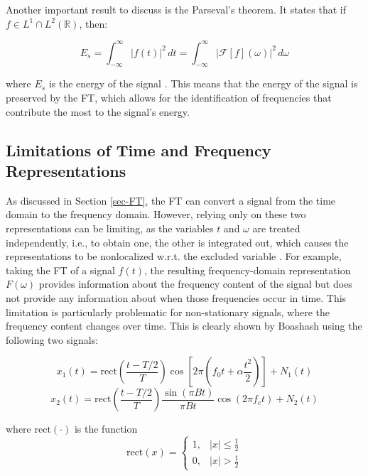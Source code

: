Another important result to discuss is the Parseval's theorem. It states that if $f \in L^1 \cap L^2(\mathbb{R})$, then:

\begin{equation}
    E_s = \int_{-\infty}^{\infty} |f(t)|^2\,dt = \int_{-\infty}^{\infty} |\mathcal{F}[f](\omega)|^2\,d\omega
    \label{eq:Parseval}
\end{equation}

\noindent where $E_s$ is the energy of the signal \cite{grochenig2001foundations}. This means that the energy of the signal is preserved by the FT, which allows for the identification of frequencies that contribute the most to the signal's energy. 

\subsection{Limitations of Time and Frequency Representations} \label{sec-lim-tf-r}

As discussed in Section \ref{sec-FT}, the FT can convert a signal from the time domain to the frequency domain. However, relying only on these two representations can be limiting, as the variables $t$ and $\omega$ are treated independently, i.e., to obtain one, the other is integrated out, which causes the representations to be nonlocalized w.r.t. the excluded variable \cite{Boashash2016Chapter1TimeFrequency}. For example, taking the FT of a signal $f(t)$, the resulting frequency-domain representation $F(\omega)$ provides information about the frequency content of the signal but does not provide any information about when those frequencies occur in time. This limitation is particularly problematic for non-stationary signals, where the frequency content changes over time. This is clearly shown by Boashash \cite{Boashash2016ChapterITimeFrequency} using the following two signals:

\begin{equation}
    x_{1}(t) = \text{rect}\left(\frac{t-T/2}{T}\right)\cos \left[2\pi \left(f_0t + \alpha \frac{t^2}{2}\right)\right] + N_1(t)
    \label{eq-xA}
\end{equation}
\begin{equation}
    x_{2}(t) = \text{rect}\left(\frac{t-T/2}{T}\right)\frac{\sin\left(\pi B t\right)}{\pi B t} \cos \left(2\pi f_c t\right) + N_2(t)
    \label{eq-xB}
\end{equation}

\noindent where $\text{rect}(\cdot)$ is the function
\begin{equation}
    \text{rect}(x) = \begin{cases}
        1, & |x| \leq \frac{1}{2} \\
        0, & |x| > \frac{1}{2}
    \end{cases}
\end{equation}

